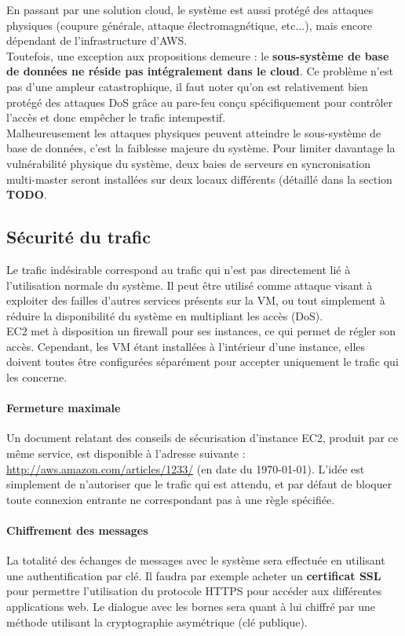 En passant par une solution cloud, le système est aussi protégé des attaques
physiques (coupure générale, attaque électromagnétique, etc...), mais encore
dépendant de l'infrastructure d'AWS. \\

Toutefois, une exception aux propositions demeure : le \textbf{sous-système de
base de données ne réside pas intégralement dans le cloud}. Ce problème n'est
pas d'une ampleur catastrophique, il faut noter qu'on est relativement bien
protégé des attaques DoS grâce au pare-feu conçu spécifiquement pour contrôler
l'accès et donc empêcher le trafic intempestif. \\

Malheureusement les attaques physiques peuvent atteindre le sous-système de
base de données, c'est la faiblesse majeure du système. Pour limiter davantage
la vulnérabilité physique du système, deux baies de serveurs en syncronisation
multi-master seront installées sur deux locaux différents (détaillé dans la
section {\huge \textbf{TODO}}.

\subsection{Sécurité du trafic}
\label{subsec:securite-trafic}

Le trafic indésirable correspond au trafic qui n'est pas directement lié à
l'utilisation normale du système. Il peut être utilisé comme attaque visant à 
exploiter des failles d'autres services présents sur la VM, ou tout
simplement à réduire la disponibilité du système en multipliant les
accès (DoS). \\

EC2 met à disposition un firewall pour ses instances, ce qui permet de régler
son accès. Cependant, les VM étant installées à l'intérieur d'une instance,
elles doivent toutes être configurées séparément pour accepter uniquement le
trafic qui les concerne.

\paragraph{Fermeture maximale}

Un document relatant des conseils de sécurisation d'instance EC2, produit par
ce même service, est disponible à l'adresse suivante :
\url{http://aws.amazon.com/articles/1233/} (en date du \today). L'idée est
simplement de n'autoriser que le trafic qui est attendu, et par défaut de
bloquer toute connexion entrante ne correspondant pas à une règle spécifiée.

\paragraph{Chiffrement des messages}

La totalité des échanges de messages avec le système sera effectuée en
utilisant une authentification par clé. Il faudra par exemple acheter un
\textbf{certificat SSL} pour permettre l'utilisation du protocole HTTPS pour
accéder aux différentes applications web. Le dialogue avec les bornes sera
quant à lui chiffré par une méthode utilisant la cryptographie asymétrique (clé
publique).


